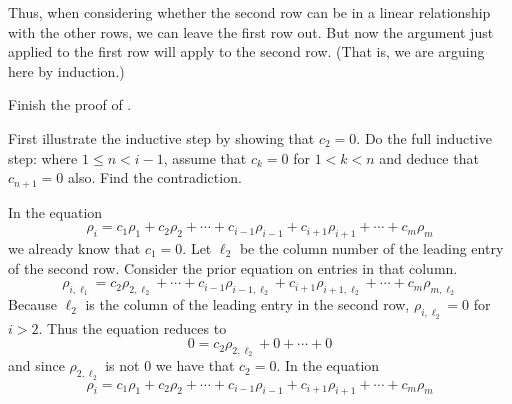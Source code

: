 \begin{exercises}
\begin{answer}
\begin{exparts}
             Thus, when considering whether the second row can be in a linear 
             relationship
             with the other rows, we can leave the first row out.
             But now the argument just applied to the first row will apply
             to the second row.
             (That is, we are arguing here by induction.)             
         \end{exparts}
      \end{answer}
  \recommended \item \label{ex:EchFormNoLinCombo} 
    Finish the proof of .
    \begin{exparts}
      \partsitem First illustrate the inductive step by showing 
         that $c_2=0$.
      \partsitem Do the full inductive step: where \( 1\leq n<i-1 \),
        assume that \( c_k=0 \)  for $1<k< n$
        and deduce that
        \( c_{n+1}=0 \) also.
      \partsitem Find the contradiction.
    \end{exparts}
    \begin{answer}
      \begin{exparts} 
        \partsitem 
          In the equation 
          \begin{equation*}
            \rho_i=c_1\rho_1+c_2\rho_2+\cdots+c_{i-1}\rho_{i-1}+
                     c_{i+1}\rho_{i+1}+\cdots+c_m\rho_m
          \end{equation*}
          we already know that $c_1=0$.
          Let $\ell_2$ be the column number of the leading entry of the
          second row. 
          Consider the prior equation on entries in that column.
          \begin{equation*}
             \rho_{i,\ell_1}=c_2\rho_{2,\ell_2}+\cdots+c_{i-1}\rho_{i-1,\ell_2}
                             +c_{i+1}\rho_{i+1,\ell_2}+\cdots+c_m\rho_{m,\ell_2}
          \end{equation*}
          Because $\ell_2$ is the column of the leading entry in the second
          row, $\rho_{i,\ell_2}=0$ for $i>2$.  
          Thus the equation reduces to  
          \begin{equation*}
             0=c_2\rho_{2,\ell_2}+0+\cdots+0
          \end{equation*}
          and since $\rho_{2,\ell_2}$ is not $0$ we have that $c_2=0$.
        \partsitem 
          In the equation 
          \begin{equation*}
            \rho_i=c_1\rho_1+c_2\rho_2+\cdots+c_{i-1}\rho_{i-1}+
                     c_{i+1}\rho_{i+1}+\cdots+c_m\rho_m

\end{equation*}
\end{exparts}
\end{answer}
\end{exercises}
